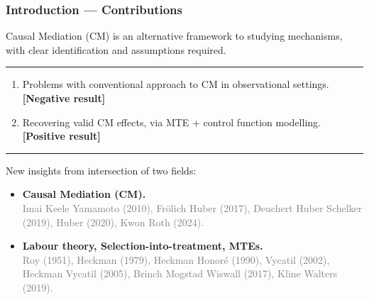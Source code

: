 \documentclass[dvipsnames]{beamer} %
\begin{document}
\begin{frame}
    \frametitle{Introduction ---  Contributions}
    Causal Mediation (CM) is an alternative framework to studying mechanisms, with clear identification and assumptions required.

    \par\noindent\rule{\textwidth}{0.4pt}
    \begin{enumerate}
        \item Problems with conventional approach to CM in observational settings.
        \\ \textbf{[Negative result]}
        \item Recovering valid CM effects, via MTE $+$ control function modelling.
        \\ \textbf{[Positive result]}
    \end{enumerate}

    \par\noindent\rule{\textwidth}{0.4pt}
    New insights from intersection of two fields:
    \begin{itemize}
        \item \textbf{Causal Mediation (CM).}
        \\ \textcolor{gray}{\footnotesize Imai Keele Yamamoto (2010), Fr\"olich Huber (2017), Deuchert Huber Schelker (2019), Huber (2020), Kwon Roth (2024).}
        \item \textbf{Labour theory, Selection-into-treatment, MTEs.}
        \\ \textcolor{gray}{\footnotesize Roy (1951), Heckman (1979), Heckman Honor\'e (1990), Vycatil (2002), Heckman Vycatil (2005), Brinch Mogstad Wiswall (2017), Kline Walters (2019).}
    \end{itemize}
\end{frame}
\end{document}

